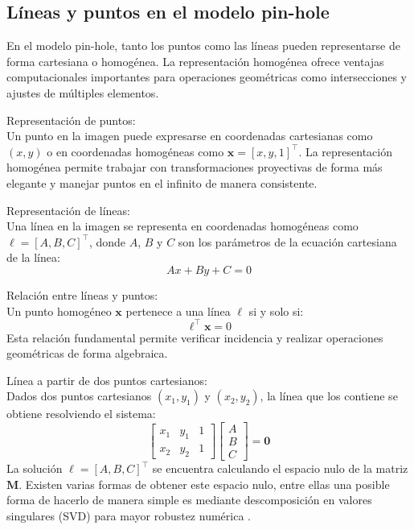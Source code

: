 \subsection{Líneas y puntos en el modelo pin-hole}\label{subsec:lines-points}

En el modelo pin-hole, tanto los puntos como las líneas pueden representarse de forma cartesiana o homogénea. La representación homogénea ofrece ventajas computacionales importantes para operaciones geométricas como intersecciones y ajustes de múltiples elementos.

Representación de puntos:\\
Un punto en la imagen puede expresarse en coordenadas cartesianas como $(x,y)$ o en coordenadas homogéneas como $\mathbf{x}=[x,y,1]^\top$. La representación homogénea permite trabajar con transformaciones proyectivas de forma más elegante y manejar puntos en el infinito de manera consistente.

Representación de líneas:\\
Una línea en la imagen se representa en coordenadas homogéneas como $\ell=[A,B,C]^\top$, donde $A$, $B$ y $C$ son los parámetros de la ecuación cartesiana de la línea:
\begin{equation}
	Ax + By + C = 0
\end{equation}

Relación entre líneas y puntos:\\
Un punto homogéneo $\mathbf{x}$ pertenece a una línea $\ell$ si y solo si:
\begin{equation}
	\ell^\top\mathbf{x} = 0
\end{equation}
Esta relación fundamental permite verificar incidencia y realizar operaciones geométricas de forma algebraica.

Línea a partir de dos puntos cartesianos:\\
Dados dos puntos cartesianos $(x_1,y_1)$ y $(x_2,y_2)$, la línea que los contiene se obtiene resolviendo el sistema:
\begin{equation}
	\begin{bmatrix}x_1&y_1&1\\x_2&y_2&1\end{bmatrix}\begin{bmatrix}A\\B\\C\end{bmatrix} = \mathbf{0}
\end{equation}
La solución $\ell=[A,B,C]^\top$ se encuentra calculando el espacio nulo de la matriz $\mathbf{M}$. Existen varias formas de obtener este espacio nulo, entre ellas una posible forma de hacerlo de manera simple es mediante descomposición en valores singulares (SVD) para mayor robustez numérica \cite{golub2013matrix}.

